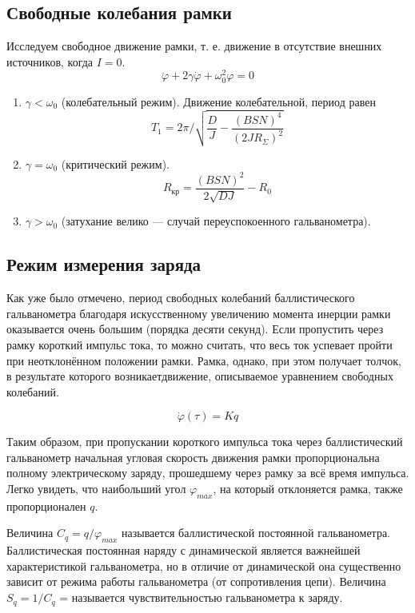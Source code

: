 \subsection{Свободные колебания рамки}
Исследуем свободное движение рамки, т. е. движение в отсутствие внешних источников, когда $I=0$.
\[
    \ddot{ \varphi} + 2\gamma\dot{ \varphi} + \omega_{0}^{2}\varphi = 0
\]

\begin{enumerate}
    \item $ \gamma < \omega_{0}$ (колебательный режим).
    Движение колебательной, период равен
    \[
        T_{1} = 2\pi/\sqrt{\frac{D}{J}-\frac{(BSN)^{4}}{(2JR_{\Sigma})^{2}}}
    \]
\item $ \gamma = \omega_{0}$ (критический режим).
    \[
        R_{\text{кр}} = \frac{(BSN)^{2}}{2\sqrt{DJ}} - R_{0}
    \]
\item $ \gamma > \omega_{0}$ (затухание велико — случай переуспокоенного гальванометра).
        
\end{enumerate}
\subsection{Режим измерения заряда}
Как уже было отмечено, период свободных колебаний баллистического гальванометра благодаря искусственному увеличению момента инерции рамки оказывается очень большим (порядка десяти секунд). Если
пропустить через рамку короткий импульс тока, то можно считать, что
весь ток успевает пройти при неотклонённом положении рамки. Рамка, однако, при этом получает толчок, в результате которого возникаетдвижение, описываемое уравнением свободных колебаний.

\[
    \dot{\varphi}(\tau) = Kq
\]

Таким образом, при пропускании короткого импульса тока через баллистический гальванометр начальная угловая скорость движения рамки
пропорциональна полному электрическому заряду, прошедшему через рамку за всё время импульса.
Легко увидеть, что наибольший угол $\varphi_{max}$,  на который отклоняется рамка, также пропорционален $q$.

Величина $C_{q} = q/\varphi_{max}$ называется баллистической постоянной гальванометра. Баллистическая постоянная наряду с динамической является важнейшей характеристикой гальванометра, но в отличие от динамической она существенно зависит от режима работы гальванометра (от сопротивления цепи). Величина
$S_{q} = 1/C_{q}$ = называется чувствительностью гальванометра к заряду.

